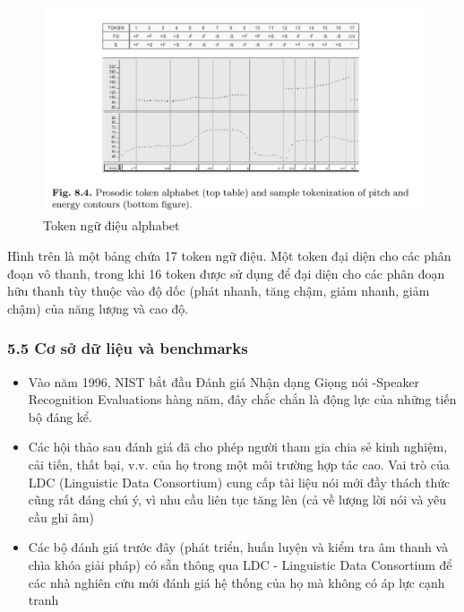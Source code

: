 \documentclass{article}
\begin{document}
	\begin{figure}[H]
		\centering
		\includegraphics[width=1\linewidth]{images/figure_8_4.png}
		\caption{Token ngữ điệu alphabet}
		\label{fig:writing-thesis}
	\end{figure}

	Hình trên là một bảng chứa 17 token ngữ điệu. Một token đại diện cho các phân đoạn vô thanh, trong khi 16 token được sử dụng để đại diện cho các phân đoạn hữu thanh tùy thuộc vào độ dốc (phát nhanh, tăng chậm, giảm nhanh, giảm chậm) của năng lượng và cao độ.
	
	\subsubsection{5.5 Cơ sở dữ liệu và benchmarks}
	\begin{itemize}
		\item Vào năm 1996, NIST bắt đầu Đánh giá Nhận dạng Giọng nói -Speaker Recognition Evaluations hàng năm, đây chắc chắn là động lực của những tiến bộ đáng kể.
		\item Các hội thảo sau đánh giá đã cho phép người tham gia chia sẻ kinh nghiệm, cải tiến, thất bại, v.v. của họ trong một môi trường hợp tác cao. Vai trò của LDC (Linguistic Data Consortium) cung cấp tài liệu nói mới đầy thách thức cũng rất đáng chú ý, vì nhu cầu liên tục tăng lên (cả về lượng lời nói và yêu cầu ghi âm)
		\item Các bộ đánh giá trước đây (phát triển, huấn luyện và kiểm tra âm thanh và chìa khóa giải pháp) có sẵn thông qua LDC - Linguistic Data Consortium để các nhà nghiên cứu mới đánh giá hệ thống của họ mà không có áp lực cạnh tranh
	\end{itemize}
	
\end{document}
